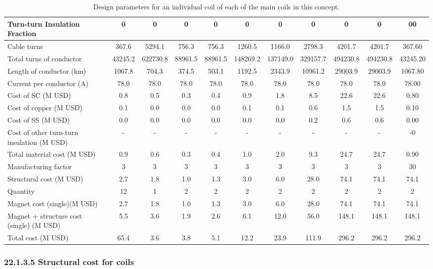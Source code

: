 \begin{table}[h]
{\begin{tabular}{lcccccccccc}
Turn-turn Insulation Fraction & 0 & 0 & 0 & 0 & 0 & 0 & 0 & 0 & 0 & 00 \\
\hline
Cable turns & 367.6 & 5294.1 & 756.3 & 756.3 & 1260.5 & 1166.0 & 2798.3 & 4201.7 & 4201.7 & 367.60 \\
Total turns of conductor & 43245.2 & 622730.8 & 88961.5 & 88961.5 & 148269.2 & 137149.0 & 329157.7 & 494230.8 & 494230.8 & 43245.20 \\
Length of conductor (km) & 1067.8 & 704.3 & 374.5 & 503.1 & 1192.5 & 2343.9 & 10961.2 & 29003.9 & 29003.9 & 1067.80 \\
Current per conductor (A) & 78.0 & 78.0 & 78.0 & 78.0 & 78.0 & 78.0 & 78.0 & 78.0 & 78.0 & 78.00 \\
\hline
Cost of SC (M USD) & 0.8 & 0.5 & 0.3 & 0.4 & 0.9 & 1.8 & 8.5 & 22.6 & 22.6 & 0.80 \\
Cost of copper (M USD) & 0.1 & 0.0 & 0.0 & 0.0 & 0.1 & 0.1 & 0.6 & 1.5 & 1.5 & 0.10 \\
Cost of SS (M USD) & 0.0 & 0.0 & 0.0 & 0.0 & 0.0 & 0.0 & 0.2 & 0.6 & 0.6 & 0.00 \\
Cost of other turn-turn insulation (M USD) & - & - & - & - & - & - & - & - & - & -0 \\
Total material cost (M USD) & 0.9 & 0.6 & 0.3 & 0.4 & 1.0 & 2.0 & 9.3 & 24.7 & 24.7 & 0.90 \\
Manufacturing factor & 3 & 3 & 3 & 3 & 3 & 3 & 3 & 3 & 3 & 30 \\
Structural cost (M USD) & 2.7 & 1.8 & 1.0 & 1.3 & 3.0 & 6.0 & 28.0 & 74.1 & 74.1 & 74.1 \\
Quantity & 12 & 1 & 2 & 2 & 2 & 2 & 2 & 2 & 2 & 2 \\
Magnet cost (single)(M USD) & 2.7 & 1.8 & 1.0 & 1.3 & 3.0 & 6.0 & 28.0 & 74.1 & 74.1 & 74.1 \\
Magnet + structure cost (single) (M USD) & 5.5 & 3.6 & 1.9 & 2.6 & 6.1 & 12.0 & 56.0 & 148.1 & 148.1 & 148.1 \\
\hline
Total cost (M USD) & 65.4 & 3.6 & 3.8 & 5.1 & 12.2 & 23.9 & 111.9 & 296.2 & 296.2 & 296.2 \\
\hline
\end{tabular}}
\caption{Design parameters for an individual coil of each of the main coils in this concept.}
\label{your-table-label}
\end{table}


\subsubsection*{22.1.3.5 Structural cost for coils}

